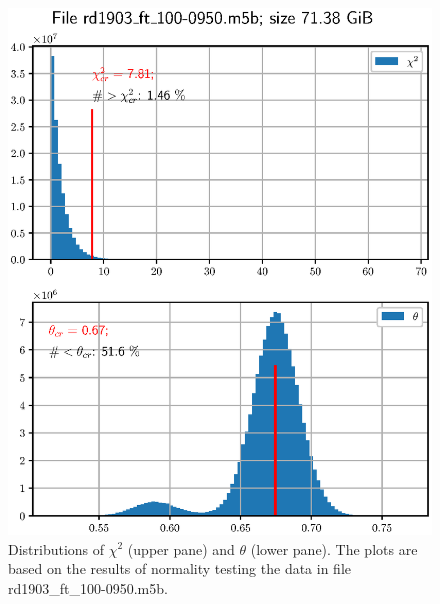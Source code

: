 \documentclass[letterpaper,twoside,12pt]{article}
\begin{document}
\begin{figure}[ht!]
  \begin{center}
  \includegraphics[width=35pc]{fig_chi2_and_thresh_distr_1.eps}
  \caption{\small Distributions of $\chi^2$ (upper pane) and $\theta$ (lower pane). The plots are based on the results of normality testing the data in file rd1903\_ft\_100-0950.m5b.}
  \label{chi2_and_thresh_distr_1}
  \end{center}
\end{figure}
\end{document}
